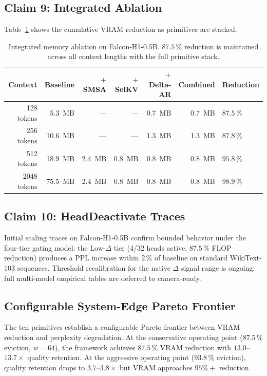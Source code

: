 \documentclass[11pt]{article}
\newcommand{\dsig}{\Delta}
\begin{document}
\subsection{Claim 9: Integrated Ablation}
Table~\ref{tab:ablation} shows the cumulative VRAM reduction as primitives
are stacked.

\begin{table}[H]
\centering
\small
\caption{Integrated memory ablation on Falcon-H1-0.5B. $87.5\,\%$ reduction
         is maintained across all context lengths with the full primitive
         stack.}
\label{tab:ablation}
\begin{tabular}{rrrrrrl}
\toprule
Context & Baseline & $+$SMSA & $+$SelKV & $+$Delta-AR & Combined & Reduction \\
\midrule
128 tokens  &  5.3~MB &   ---   &   ---   & 0.7~MB & 0.7~MB & $87.5\,\%$ \\
256 tokens  & 10.6~MB &   ---   &   ---   & 1.3~MB & 1.3~MB & $87.8\,\%$ \\
512 tokens  & 18.9~MB & 2.4~MB & 0.8~MB & 0.8~MB & 0.8~MB & $95.8\,\%$ \\
2048 tokens & 75.5~MB & 2.4~MB & 0.8~MB & 0.8~MB & 0.8~MB & $\mathbf{98.9\,\%}$ \\
\bottomrule
\end{tabular}
\end{table}

\subsection{Claim 10: HeadDeactivate Traces}
Initial scaling traces on Falcon-H1-0.5B confirm bounded behavior under the
four-tier gating model: the Low-$\dsig$ tier (4/32 heads active, $87.5\,\%$
FLOP reduction) produces a PPL increase within $2\,\%$ of baseline on
standard WikiText-103 sequences. Threshold recalibration for the native
$\dsig$ signal range is ongoing; full multi-model empirical tables are
deferred to camera-ready.

\subsection{Configurable System-Edge Pareto Frontier}
The ten primitives establish a configurable Pareto frontier between VRAM
reduction and perplexity degradation. At the conservative operating point
($87.5\,\%$ eviction, $w{=}64$), the framework achieves $87.5\,\%$ VRAM
reduction with $13.0$--$13.7\!\times$ quality retention. At the aggressive
operating point ($93.8\,\%$ eviction), quality retention drops to
$3.7$--$3.8\!\times$ but VRAM approaches $95\%+$ reduction.
\end{document}
